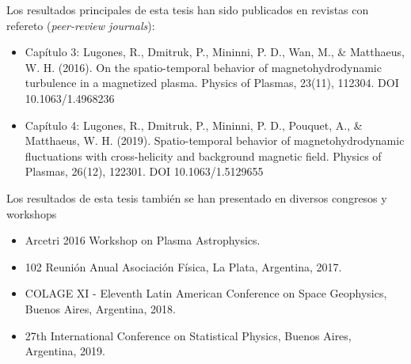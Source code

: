 \noindent Los resultados principales de esta tesis han sido publicados
en revistas con refereto (\emph{peer-review journals}):
\begin{itemize}
\item Capítulo 3: Lugones, R., Dmitruk, P., Mininni, P. D., Wan, M., \&
  Matthaeus, W. H. (2016). On the spatio-temporal behavior of
  magnetohydrodynamic turbulence in a magnetized plasma. Physics of
  Plasmas, 23(11), 112304. DOI 10.1063/1.4968236
\item Capítulo 4: Lugones, R., Dmitruk, P., Mininni, P. D., Pouquet,
  A., \& Matthaeus, W. H. (2019). Spatio-temporal behavior of
  magnetohydrodynamic fluctuations with cross-helicity and background
  magnetic field. Physics of Plasmas, 26(12), 122301. DOI
  10.1063/1.5129655
\end{itemize}

\noindent Los resultados de esta tesis también se han presentado en
diversos congresos y workshops
\begin{itemize}
\item Arcetri 2016 Workshop on Plasma Astrophysics.
\item 102 Reunión Anual Asociación Física, La Plata, Argentina, 2017.
\item COLAGE XI - Eleventh Latin American Conference on Space
  Geophysics, Buenos Aires, Argentina, 2018.
\item 27th International Conference on Statistical Physics, Buenos
  Aires, Argentina, 2019.
\end{itemize}
